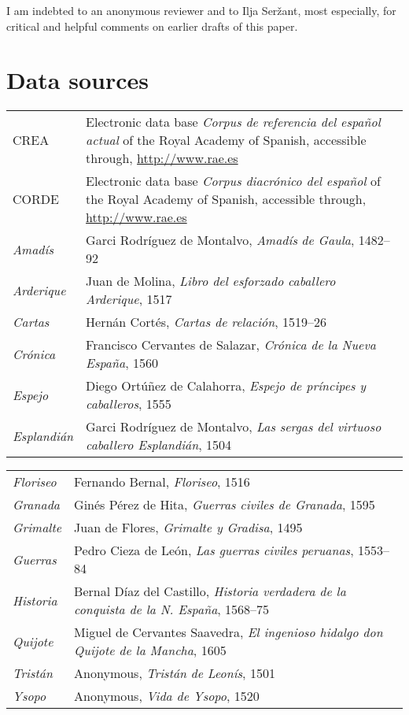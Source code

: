 \documentclass[output=paper]{LSP/langsci}
\begin{document}
I am indebted to an anonymous reviewer and to Ilja Seržant, most especially, for critical and helpful comments on earlier drafts of this paper.

\section*{Data sources}

\begin{tabularx}{\textwidth}{lL}
CREA & Electronic data base \textit{Corpus de referencia del español actual} of the Royal Academy of Spanish, accessible through, \url{http://www.rae.es}\\

CORDE & Electronic data base \textit{Corpus diacrónico del español} of the Royal Academy of Spanish, accessible through, \url{http://www.rae.es}\\

\textit{Amadís} &Garci Rodríguez de Montalvo,\textit{ Amadís} \textit{de Gaula}, 1482–92 \\
\textit{Arderique} &Juan de Molina, \textit{Libro del esforzado caballero Arderique}, 1517\\
\textit{Cartas} &Hernán Cortés, \textit{Cartas de relación}, 1519–26 \\
\textit{Crónica} &Francisco Cervantes de Salazar, \textit{Crónica de la Nueva España}, 1560 \\
\textit{Espejo} &Diego Ortúñez de Calahorra, \textit{Espejo de príncipes y caballeros}, 1555\\
\textit{Esplandián}& Garci Rodríguez de Montalvo, \textit{Las sergas del virtuoso caballero Esplandián}, 1504 \\
\end{tabularx}
\newpage 
\begin{tabularx}{\textwidth}{lL}
\textit{Floriseo} &Fernando Bernal, \textit{Floriseo}, 1516\\
\textit{Granada} &Ginés Pérez de Hita, \textit{Guerras civiles de Granada}, 1595 \\
\textit{Grimalte} &Juan de Flores, \textit{Grimalte y Gradisa}, 1495\\
\textit{Guerras} &Pedro Cieza de León, \textit{Las guerras civiles peruanas}, 1553–84\\
\textit{Historia} &Bernal Díaz del Castillo, \textit{Historia verdadera de la conquista de la N. España}, 1568–75\\
\textit{Quijote} &Miguel de Cervantes Saavedra, \textit{El ingenioso hidalgo don Quijote de la Mancha}, 1605\\
\textit{Tristán} &Anonymous, \textit{Tristán} \textit{de Leonís}, 1501 \\
\textit{Ysopo} &Anonymous, \textit{Vida de Ysopo}, 1520\\
\end{tabularx}
\end{document}
